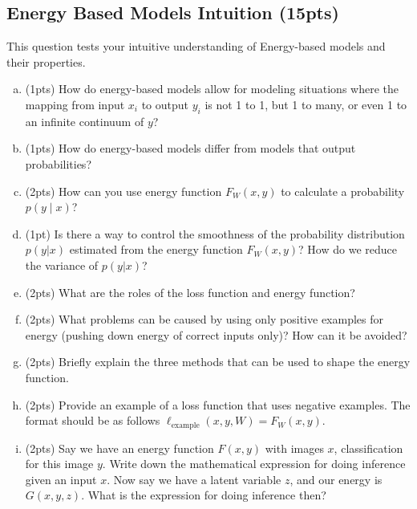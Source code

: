 \documentclass{article}
\begin{document}
\subsection{Energy Based Models Intuition (15pts) }
This question tests your intuitive understanding of Energy-based models and their properties. 
\begin{enumerate}[(a)]

\item (1pts) How do energy-based models allow for modeling situations where the mapping from input $x_i$ to output $y_i$ is not 1 to 1, but 1 to many, or even 1 to an infinite continuum of $y$?


\item (1pts) How do energy-based models differ from models that output probabilities?


\item  (2pts) How can you use energy function $F_W(x, y)$ to calculate a probability $p(y \mid x)$?



\item (1pt) Is there a way to control the smoothness of the probability distribution $p(y|x)$ estimated from the energy function $F_W(x,y)$? How do we reduce the variance of $p(y|x)$?


\item (2pts) What are the roles of the loss function and energy function? 



\item (2pts) What problems can be caused by using only positive examples for energy (pushing down energy of correct inputs only)? How can it be avoided?



\item 
(2pts) Briefly explain the three methods that can be used to shape the energy function.



\item (2pts) Provide an example of a loss function that uses negative examples. The format should be as follows $\ell_\text{example}(x, y, W) = F_W(x, y)$.



\item (2pts) Say we have an energy function $F(x, y)$ with images $x$, classification for this image $y$.
	Write down the mathematical expression for doing inference given an input $x$.
	Now say we have a latent variable $z$, and our energy is $G(x, y, z)$.
	What is the expression for doing inference then?





\end{enumerate}
\end{document}
